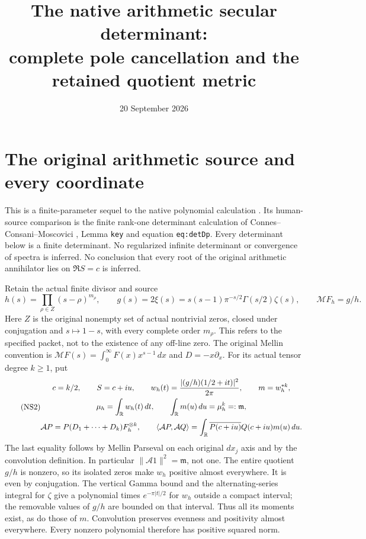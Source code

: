 \documentclass[11pt]{article}
\title{The native arithmetic secular determinant:\\
complete pole cancellation and the retained quotient metric}
\author{}\date{20 September 2026}
\begin{document}
\maketitle

\section{The original arithmetic source and every coordinate}

This is a finite-parameter sequel to the native polynomial calculation
\cite{Native}. Its human-source comparison is the finite rank-one
determinant calculation of Connes--Consani--Moscovici \cite{CCM},
Lemma \texttt{key} and equation \texttt{eq:detDp}.
Every determinant below is a finite determinant. No regularized
infinite determinant or convergence of spectra is inferred.
No conclusion that every root of the original arithmetic
annihilator lies on $\Re S=c$ is inferred.

Retain the actual finite divisor and source
\begin{equation}\tag{NS1}\label{NS1}
h(s)=\prod_{\rho\in Z}(s-\rho)^{m_\rho},\qquad
g(s)=2\xi(s)=s(s-1)\pi^{-s/2}\Gamma(s/2)\zeta(s),\qquad
\mathcal M F_h=g/h.
\end{equation}
Here $Z$ is the original nonempty set of actual nontrivial zeros,
closed under conjugation and $s\mapsto1-s$, with every complete
order $m_\rho$. This refers to the specified packet, not to the
existence of any off-line zero. The original Mellin convention is
$\mathcal M F(s)=\int_0^\infty F(x)x^{s-1}\,dx$ and $D=-x\partial_x$.
For its actual tensor degree $k\geq1$, put
\begin{equation}\tag{NS2}\label{NS2}
\begin{gathered}
c=k/2,\qquad S=c+iu,\qquad
w_h(t)=\frac{|(g/h)(1/2+it)|^2}{2\pi},\qquad m=w_h^{*k},\\
\mu_h=\int_\mathbb R w_h(t)\,dt,\qquad
\int_\mathbb R m(u)\,du=\mu_h^k=:\mathfrak m,\\
\mathcal A P=P(D_1+\cdots+D_k)F_h^{\otimes k},\qquad
\langle\mathcal A P,\mathcal A Q\rangle
 =\int_\mathbb R\overline{P(c+iu)}Q(c+iu)m(u)\,du .
\end{gathered}
\end{equation}
The last equality follows by Mellin Parseval on each original
$dx_j$ axis and by the convolution definition. In particular
$\|\mathcal A1\|^2=\mathfrak m$, not one.
The entire quotient $g/h$ is nonzero, so its isolated zeros make
$w_h$ positive almost everywhere. It is even by conjugation.
The vertical Gamma bound and the alternating-series integral for
$\zeta$ give a polynomial times $e^{-\pi|t|/2}$ for $w_h$ outside
a compact interval; the removable values of $g/h$ are bounded on
that interval. Thus all its moments exist, as do those of $m$.
Convolution preserves evenness and positivity almost everywhere.
Every nonzero polynomial therefore has positive squared norm.
\end{document}
